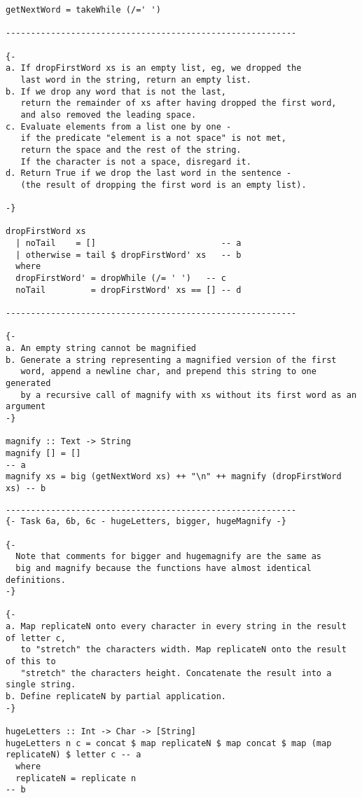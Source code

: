 \documentclass[11pt]{article}
\begin{document}
{\begin{verbatim}
getNextWord = takeWhile (/=' ')

----------------------------------------------------------

{-
a. If dropFirstWord xs is an empty list, eg, we dropped the
   last word in the string, return an empty list.
b. If we drop any word that is not the last, 
   return the remainder of xs after having dropped the first word, 
   and also removed the leading space.
c. Evaluate elements from a list one by one - 
   if the predicate "element is a not space" is not met, 
   return the space and the rest of the string. 
   If the character is not a space, disregard it.
d. Return True if we drop the last word in the sentence - 
   (the result of dropping the first word is an empty list).

-}

dropFirstWord xs
  | noTail    = []                         -- a
  | otherwise = tail $ dropFirstWord' xs   -- b
  where 
  dropFirstWord' = dropWhile (/= ' ')   -- c
  noTail         = dropFirstWord' xs == [] -- d

----------------------------------------------------------

{-
a. An empty string cannot be magnified
b. Generate a string representing a magnified version of the first
   word, append a newline char, and prepend this string to one generated
   by a recursive call of magnify with xs without its first word as an argument
-}

magnify :: Text -> String
magnify [] = []                                                         -- a
magnify xs = big (getNextWord xs) ++ "\n" ++ magnify (dropFirstWord xs) -- b
\end{verbatim}
\newpage
\begin{landscape}
\begin{verbatim}
----------------------------------------------------------
{- Task 6a, 6b, 6c - hugeLetters, bigger, hugeMagnify -}

{- 
  Note that comments for bigger and hugemagnify are the same as 
  big and magnify because the functions have almost identical definitions.
-}

{-
a. Map replicateN onto every character in every string in the result of letter c, 
   to "stretch" the characters width. Map replicateN onto the result of this to
   "stretch" the characters height. Concatenate the result into a single string.
b. Define replicateN by partial application.
-}

hugeLetters :: Int -> Char -> [String]
hugeLetters n c = concat $ map replicateN $ map concat $ map (map replicateN) $ letter c -- a
  where                                                                                  
  replicateN = replicate n                                                               -- b


\end{verbatim}
\end{landscape}}
\end{document}

